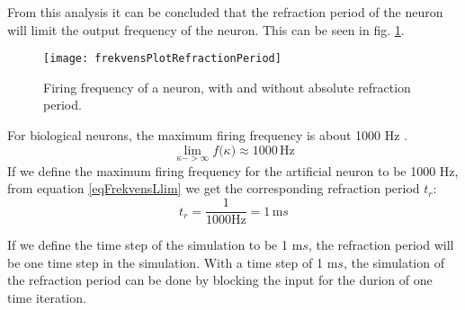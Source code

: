From this analysis it can be concluded that the refraction period of the neuron will limit the output frequency of the neuron.
This can be seen in fig. \ref{figFrekvensMedOgUtenRefractionPeriod}.

\begin{figure}[bhtp]
	\begin{center}
		\texttt{[image: frekvensPlotRefractionPeriod]}
	\end{center}
	\caption{Firing frequency of a neuron, with and without absolute refraction period.}
	\label{figFrekvensMedOgUtenRefractionPeriod}
\end{figure}

For biological neurons, the maximum firing frequency is about 1000 Hz \cite{NeuroscienceExploringTheBrain3edKAP4}. %
\begin{equation}
	\lim_{\kappa->\infty}{ f(\kappa}) \approx 1000 \, \text{Hz}
\end{equation}
If we define the maximum firing frequency for the artificial neuron to be 1000 Hz, from equation \ref{eqFrekvensLlim} we get the corresponding refraction period $t_r$:
\begin{equation}
	t_r = \frac{1}{1000 \text{Hz}} = 1 \, \text{m}s %
\end{equation}

If we define the time step of the simulation to be 1 m$s$, the refraction period will be one time step in the simulation.
With a time step of 1 m$s$, the simulation of the refraction period can be done by blocking the input for the durion of one time iteration.



